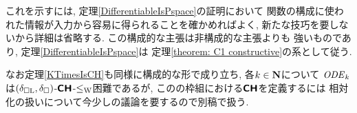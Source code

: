 これを示すには, 
定理\ref{DifferentiableIsPspace}の証明において
関数の構成に使われた情報が入力から容易に得られることを確かめればよく, 
新たな技巧を要しないから詳細は省略する. 
この構成的な主張は非構成的な主張よりも
強いものであり\cite[補題3.7, 3.8]{kawamura2010operators}, 
定理\ref{DifferentiableIsPspace}は
定理\ref{theorem: C1 constructive}の系として従う. 


なお定理\ref{KTimesIsCH}も同様に構成的な形で成り立ち, 
各$k \in \mathbf N$について
$\mathit{ODE} _k$は$(\delta _{\square \mathrm L}, \delta _\square)$-$\text{\bfseries \sffamily \upshape CH}$-$\leq _{\mathrm W}$困難であるが, 
この\cite{kawamura2010operators}の枠組における$\text{\bfseries \sffamily \upshape CH}$を定義するには
相対化の扱いについて今少しの議論を要するので別稿で扱う. 


